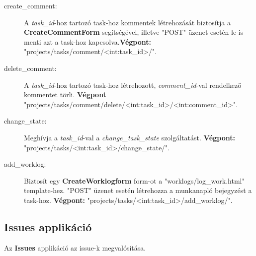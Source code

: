 \begin{itemize}
\begin{description}
		\item[create\_comment:] A \textit{task\_id}-hoz tartozó task-hoz kommentek létrehozását biztosítja a \textbf{CreateCommentForm} segítségével, illetve "POST" üzenet esetén le is menti azt a task-hoz kapcsolva.\textbf{Végpont:} "projects/tasks/comment/<int:task\_id>/".
		\item[delete\_comment:] A \textit{task\_id}-hoz tartozó task-hoz létrehozott, \textit{comment\_id}-val rendelkező kommentet törli. \textbf{Végpont} "projects/tasks/comment/delete/<int:task\_id>/<int:comment\_id>".
		\item[change\_state:] Meghívja a \textit{task\_id}-val a \textit{change\_task\_state} szolgáltatást. \textbf{Végpont:} "projects/tasks/<int:task\_id>/change\_state/".
		\item[add\_worklog:] Biztosít egy \textbf{CreateWorklogform} form-ot a "worklogs/log\_work.html" template-hez. "POST" üzenet esetén létrehozza a munkanapló bejegyzést a task-hoz. \textbf{Végpont:} "projects/tasks/<int:task\_id>/add\_worklog/".
	\end{description}
\end{itemize}	

\subsection{Issues applikáció}

Az \textbf{Issues} applikáció az issue-k megvalósítása. 


